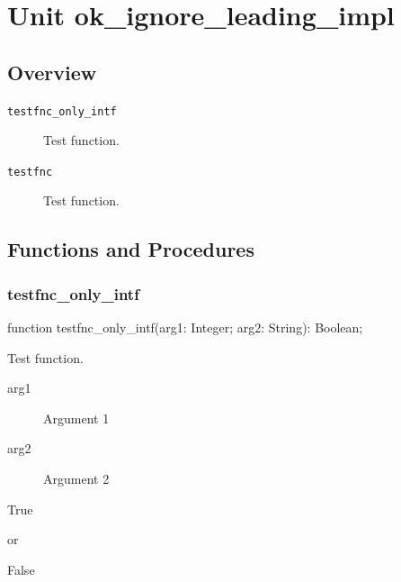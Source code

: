 \documentclass{report}
\newif\ifpdf
\begin{document}
\label{toc}\tableofcontents
\newpage
\newlength{\tmplength}
\chapter{Unit ok{\_}ignore{\_}leading{\_}impl}
\label{ok_ignore_leading_impl}
\section{Overview}
\begin{description}
\item[\texttt{testfnc{\_}only{\_}intf}]Test function.
\item[\texttt{testfnc}]Test function.
\end{description}
\section{Functions and Procedures}
\ifpdf
\subsection*{\large{\textbf{testfnc{\_}only{\_}intf}}\normalsize\hspace{1ex}\hrulefill}
\else
\subsection*{testfnc{\_}only{\_}intf}
\fi
\label{ok_ignore_leading_impl-testfnc_only_intf}
\begin{list}{}{
\setlength{\itemindent}{0cm}
\setlength{\listparindent}{0cm}
\setlength{\leftmargin}{\evensidemargin}
\addtolength{\leftmargin}{\tmplength}
\settowidth{\labelsep}{X}
\addtolength{\leftmargin}{\labelsep}
\setlength{\labelwidth}{\tmplength}
}
\item[\textbf{Declaration}\hfill]
\ifpdf
\begin{flushleft}
\fi
\begin{ttfamily}
function testfnc{\_}only{\_}intf(arg1: Integer; arg2: String): Boolean;\end{ttfamily}

\ifpdf
\end{flushleft}
\fi

\par
\item[\textbf{Description}]
Test function.

  \par
\item[\textbf{Parameters}]
\begin{description}
\item[arg1] Argument 1
\item[arg2] Argument 2
\end{description}
\item[\textbf{Returns}]\begin{ttfamily}True\end{ttfamily} or \begin{ttfamily}False\end{ttfamily}


\end{list}
\ifpdf
\end{document}
